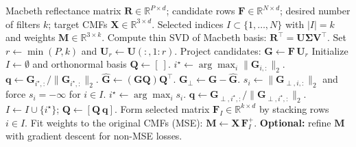 \begingroup
\setlength{\textfloatsep}{6pt}
\setlength{\floatsep}{6pt}
\setlength{\intextsep}{6pt}
\begin{algorithm}[H]
\caption{PCA / Matching-Pursuit selection using Macbeth patch subspace}
\label{alg:pca-macbeth-selection}
\begin{algorithmic}[1]
\Require Macbeth reflectance matrix $\mathbf{R}\in\mathbb{R}^{P\times d}$; candidate rows $\mathbf{F}\in\mathbb{R}^{N\times d}$; desired number of filters $k$; target CMFs $\mathbf{X}\in\mathbb{R}^{3\times d}$.
\Ensure Selected indices $I\subset\{1,\dots,N\}$ with $|I|=k$ and weights $\boldsymbol{M}\in\mathbb{R}^{3\times k}$.
\State Compute thin SVD of Macbeth basis: $\mathbf{R}^\top = \mathbf{U}\boldsymbol{\Sigma}\mathbf{V}^\top$.
\State Set $r\leftarrow \min(P,k)$ and $\mathbf{U}_r \leftarrow \mathbf{U}(:,1\!:\!r)$.
\State Project candidates: $\mathbf{G} \leftarrow \mathbf{F}\,\mathbf{U}_r$ 
\State Initialize $I\leftarrow \emptyset$ and orthonormal basis $\mathbf{Q}\leftarrow [\ ]$.
        \State $i^\star \leftarrow \arg\max_i \|\mathbf{G}_{i,:}\|_2$.
        \State $\mathbf{q} \leftarrow \mathbf{G}_{i^\star,:}/\|\mathbf{G}_{i^\star,:}\|_2$.
    \Else
        \State $\widehat{\mathbf{G}} \leftarrow (\mathbf{G}\mathbf{Q})\mathbf{Q}^\top$.
        \State $\mathbf{G}_\perp \leftarrow \mathbf{G} - \widehat{\mathbf{G}}$.
        \State $s_i\leftarrow \|\mathbf{G}_{\perp,i,:}\|_2$ and force $s_i=-\infty$ for $i\in I$.
        \State $i^\star \leftarrow \arg\max_i s_i$.
        \State $\mathbf{q} \leftarrow \mathbf{G}_{\perp,i^\star,:}/\|\mathbf{G}_{\perp,i^\star,:}\|_2$.
    \EndIf
    \State $I \leftarrow I\cup\{i^\star\}$; $\mathbf{Q} \leftarrow [\mathbf{Q}\ \mathbf{q}]$.
\EndFor
\State Form selected matrix $\mathbf{F}_I\in\mathbb{R}^{k\times d}$ by stacking rows $i\in I$.
\State Fit weights to the original CMFs (MSE): $\boldsymbol{M} \leftarrow \mathbf{X}\,\mathbf{F}_I^{+}$.
\State \textbf{Optional:} refine $\boldsymbol{M}$ with gradient descent for non-MSE losses.
\end{algorithmic}
\end{algorithm}
\endgroup

